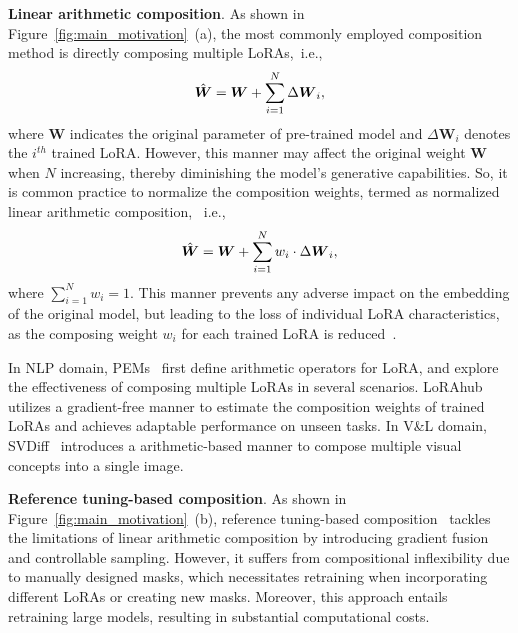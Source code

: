 \noindent\textbf{Linear arithmetic composition}. 
As shown in Figure~\ref{fig:main_motivation}~(a), the most commonly employed composition method is directly composing multiple LoRAs,~i.e., 
\begin{equation}
\vspace{-1mm}
\hat{\boldsymbol{W}} = \boldsymbol{W} + \sum_{i=1}^N \Delta \boldsymbol{W}_i, 
\vspace{-1mm}
\label{Eq.Direcly-Combination}
\end{equation}
where $\boldsymbol{W}$ indicates the original parameter of pre-trained model and $\Delta\boldsymbol{W}_i$ denotes the $i^{th}$ trained LoRA.
However, this manner may affect the original weight $\boldsymbol{W}$ when $N$ increasing, thereby diminishing the model's generative capabilities.
So, it is common practice to normalize the composition weights, termed as normalized linear arithmetic composition, ~i.e., 
\begin{equation}
\vspace{-1mm}
\hat{\boldsymbol{W}} = \boldsymbol{W} + \sum_{i=1}^N w_i \cdot \Delta \boldsymbol{W}_i,
\vspace{-1mm}
\label{Eq.Normalize-Combination}
\end{equation}
where $\sum_{i=1}^N w_i = 1$. This manner prevents any adverse impact on the embedding of the original model, but leading to the loss of individual LoRA characteristics, as the composing weight $w_i$ for each trained LoRA is reduced~\citep{gu2023mix}. 

In NLP domain, PEMs~\citep{zhang2023composing} first  define arithmetic operators for LoRA, and explore the effectiveness of composing multiple LoRAs in several scenarios. LoRAhub~\citep{huang2023lorahub} utilizes a gradient-free manner to estimate the composition weights of trained LoRAs and achieves adaptable performance on unseen tasks. In V\&L domain, SVDiff~\citep{han2023svdiff} introduces a arithmetic-based manner to compose multiple visual concepts into a single image.

\noindent\textbf{Reference tuning-based composition}. As shown in Figure~\ref{fig:main_motivation}~(b), reference tuning-based composition~\citep{gu2023mix} tackles the limitations of linear arithmetic composition by introducing gradient fusion and controllable sampling. However, it suffers from compositional inflexibility due to manually designed masks, which necessitates retraining when incorporating different LoRAs or creating new masks. Moreover, this approach entails retraining large models, resulting in substantial computational costs.

